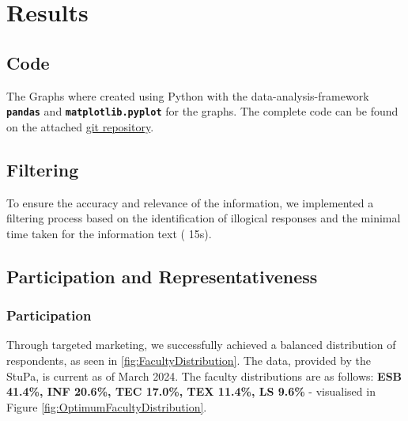 \pagebreak

\chapter{Results}

\section{Code}
The Graphs where created using Python with the data-analysis-framework \textbf{\texttt{pandas}} and \textbf{\texttt{matplotlib.pyplot}} for the graphs. The complete code can be found on the attached \href{https://github.com/MosaicsStudio/STUPA-Vollsolidar-Statistik}{git repository}.

\section*{Filtering}

To ensure the accuracy and relevance of the information, we implemented a filtering process based on the identification of illogical responses and the minimal time taken for the information text ( 15s). 
\section{Participation and Representativeness}
\subsection{Participation}


\begin{multicols}{2}
    {
        
    } \columnbreak {
        
    }
\end{multicols}

Through targeted marketing, we successfully achieved a balanced distribution of respondents, as seen in \ref{fig:FacultyDistribution}.  
The  data, provided by the StuPa, is current as of March 2024. The faculty distributions are as follows: \textbf{ESB 41.4\%, INF 20.6\%, TEC 17.0\%, TEX 11.4\%, LS 9.6\%} - visualised in Figure \ref{fig:OptimumFacultyDistribution}.

